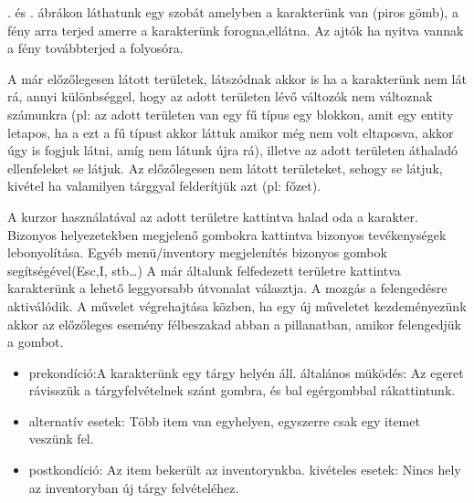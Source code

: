 . és . ábrákon láthatunk egy szobát amelyben a karakterünk van (piros gömb), a fény arra terjed amerre a karakterünk forogna,ellátna.
Az ajtók ha nyitva vannak a fény továbbterjed a folyosóra.

A már előzőlegesen látott területek, látszódnak akkor is ha a karakterünk nem lát rá, annyi különbséggel, hogy az adott területen lévő változók nem változnak számunkra (pl: az adott területen van egy fű típus egy blokkon, amit egy entity letapos, ha a ezt a fű típust akkor láttuk amikor még nem volt eltaposva, akkor úgy is fogjuk látni, amíg nem látunk újra rá), illetve az adott területen áthaladó ellenfeleket se látjuk.
Az előzőlegesen nem látott területeket, sehogy se látjuk, kivétel ha valamilyen tárggyal felderítjük azt (pl: főzet).




A kurzor használatával az adott területre kattintva halad oda a karakter.
Bizonyos helyezetekben megjelenő gombokra kattintva bizonyos tevékenységek lebonyolítása.
Egyéb menü/inventory megjelenítés bizonyos gombok segítségével(Esc,I, stb…)
A már általunk felfedezett területre kattintva karakterünk a lehető leggyorsabb útvonalat választja.
A mozgás a felengedésre aktiválódik.
A művelet végrehajtása közben, ha egy új műveletet kezdeményezünk akkor az előzőleges esemény félbeszakad abban a pillanatban, amikor felengedjük a gombot.





\begin{itemize}
    \item prekondíció:A karakterünk egy tárgy helyén áll.
    általános müködés: Az egeret rávisszük a tárgyfelvételnek szánt gombra, és bal egérgombbal rákattintunk.
    \item alternatív esetek: Több item van egyhelyen, egyszerre csak egy itemet veszünk fel.
    \item postkondíció: Az item bekerült az inventorynkba.
    kivételes esetek: Nincs hely az inventoryban új tárgy felvételéhez.
\end{itemize}

